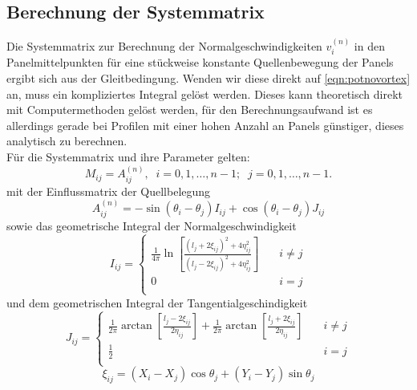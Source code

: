 \subsection{Berechnung der Systemmatrix}
\label{chap:systemmatrixtheory}
Die Systemmatrix zur Berechnung der Normalgeschwindigkeiten $v_i^{(n)}$ in den Panelmittelpunkten für eine stückweise konstante Quellenbewegung der Panels ergibt sich aus der Gleitbedingung. Wenden wir diese direkt auf \ref{eqn:potnovortex} an, muss ein kompliziertes Integral gelöst werden. Dieses kann theoretisch direkt mit Computermethoden gelöst werden, für den Berechnungsaufwand ist es allerdings gerade bei Profilen mit einer hohen Anzahl an Panels günstiger, dieses analytisch zu berechnen. \\
Für die Systemmatrix und ihre Parameter gelten:
\begin{equation}
M_{ij} = A_{ij}^{(n)}, \;\; i = 0, 1, \ldots , n-1; \;\; j = 0,1,\ldots , n-1.
\end{equation}
mit der Einflussmatrix der Quellbelegung
\begin{equation}
\label{eq:An}
A_{ij}^{(n)} = -\sin {(\theta _i - \theta _j)} I_{ij} + \cos{(\theta _i - \theta _j)} J_{ij}
\end{equation}
sowie das geometrische Integral der Normalgeschwindigkeit
\begin{equation}
I_{ij} = 
     \begin{cases}
       \frac{1}{4\pi } \ln \left[ \frac{(l_j + 2 \xi_{ij})^2 + 4 \eta_{ij}^2}{(l_j -2 \xi _{ij})^2 + 4 \eta_{ij}^2} \right] &\quad i \neq j \\
       0 &\quad i = j \\
     \end{cases}
\end{equation}
und dem geometrischen Integral der Tangentialgeschindigkeit
\begin{equation}
J_{ij} = 
     \begin{cases}
       \frac{1}{2\pi } \arctan \left[ \frac{l_j - 2 \xi_{ij}}{2 \eta_{ij}} \right] + \frac{1}{2\pi } \arctan \left[ \frac{l_j + 2 \xi_{ij}}{2 \eta_{ij}} \right] &\quad i \neq j \\
       \frac{1}{2} &\quad i = j \\
     \end{cases}
\end{equation}
\begin{equation}
\label{eq:xi}
\xi_{ij} =  (X_i - X_j) \cos \theta _j + (Y_i - Y_j) \sin \theta _j
\end{equation}
